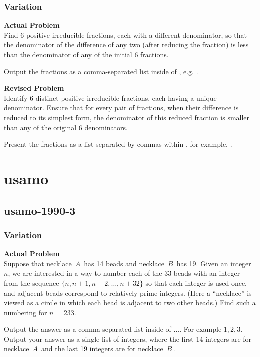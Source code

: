 \subsubsection{Variation}
\textbf{Actual Problem}\\
Find 6 positive irreducible fractions, each with a different denominator, so that the denominator of the difference of any two (after reducing the fraction) is less than the denominator of any of the initial 6 fractions.

Output the fractions as a comma-separated list inside of \boxed, e.g. .

\textbf{Revised Problem}\\
Identify 6 distinct positive irreducible fractions, each having a unique denominator. Ensure that for every pair of fractions, when their difference is reduced to its simplest form, the denominator of this reduced fraction is smaller than any of the original 6 denominators.

Present the fractions as a list separated by commas within \boxed, for example, .

\section{usamo}
\subsection{usamo-1990-3}
\subsubsection{Variation}
\textbf{Actual Problem}\\
Suppose that necklace $\, A \,$ has 14 beads and necklace $\, B \,$ has 19. 
Given an integer $n$, we are interested in a way to number each of the 33 beads with an integer from the sequence $\{ n, n+1, n+2, \dots, n+32 \}$ so that each integer is used once, and adjacent beads correspond to relatively prime integers. (Here a ``necklace'' is viewed as a circle in which each bead is adjacent to two other beads.) Find such a numbering for $n$ = 233.

Output the answer as a comma separated list inside of $\boxed{...}$. For example $\boxed{1, 2, 3}$.
Output your answer as a single list of integers, where the first 14 integers are for necklace $\, A \,$ and the last 19 integers are for necklace $\, B \,$.

